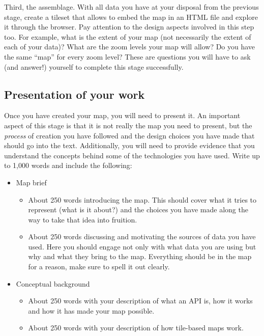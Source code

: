 \documentclass[
  letterpaper,
  DIV=11,
  numbers=noendperiod]{scrreprt}
\begin{document}
Third, the assemblage. With all data you have at your disposal from the
previous stage, create a tileset that allows to embed the map in an HTML
file and explore it through the browser. Pay attention to the design
aspects involved in this step too. For example, what is the extent of
your map (not necessarily the extent of each of your data)? What are the
zoom levels your map will allow? Do you have the same ``map'' for every
zoom level? These are questions you will have to ask (and answer!)
yourself to complete this stage successfully.

\hypertarget{presentation-of-your-work}{%
\subsection*{Presentation of your
work}\label{presentation-of-your-work}}

Once you have created your map, you will need to present it. An
important aspect of this stage is that it is not really the map you need
to present, but the \emph{process} of creation you have followed and the
design choices you have made that should go into the text. Additionally,
you will need to provide evidence that you understand the concepts
behind some of the technologies you have used. Write up to 1,000 words
and include the following:

\begin{itemize}
\item
  Map brief

  \begin{itemize}
  \item
    About 250 words introducing the map. This should cover what it tries
    to represent (what is it about?) and the choices you have made along
    the way to take that idea into fruition.
  \item
    About 250 words discussing and motivating the sources of data you
    have used. Here you should engage not only with what data you are
    using but why and what they bring to the map. Everything should be
    in the map for a reason, make sure to spell it out clearly.
  \end{itemize}
\item
  Conceptual background

  \begin{itemize}
  \item
    About 250 words with your description of what an API is, how it
    works and how it has made your map possible.
  \item
    About 250 words with your description of how tile-based maps work.
  \end{itemize}
\end{itemize}
\end{document}
